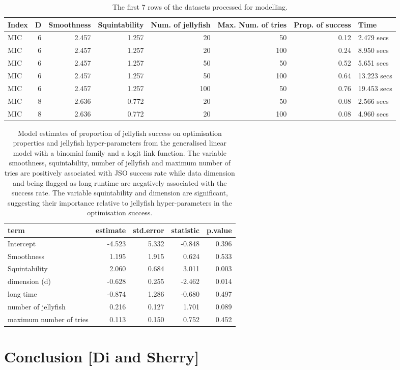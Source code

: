 \documentclass[
  number,
  preprint,
  3p]{elsarticle}
\begin{document}
\begingroup\fontsize{7}{9}\selectfont

\begin{longtable}[t]{lrrrrrrl}

\caption{\label{tbl-mod-data}The first 7 rows of the datasets processed
for modelling.}

\tabularnewline

\toprule
Index & D & Smoothness & Squintability & Num. of jellyfish & Max. Num. of tries & Prop. of success & Time\\
\midrule
MIC & 6 & 2.457 & 1.257 & 20 & 50 & 0.12 & 2.479 secs\\
MIC & 6 & 2.457 & 1.257 & 20 & 100 & 0.24 & 8.950 secs\\
MIC & 6 & 2.457 & 1.257 & 50 & 50 & 0.52 & 5.651 secs\\
MIC & 6 & 2.457 & 1.257 & 50 & 100 & 0.64 & 13.223 secs\\
MIC & 6 & 2.457 & 1.257 & 100 & 50 & 0.76 & 19.453 secs\\
\addlinespace
MIC & 8 & 2.636 & 0.772 & 20 & 50 & 0.08 & 2.566 secs\\
MIC & 8 & 2.636 & 0.772 & 20 & 100 & 0.08 & 4.960 secs\\
\bottomrule

\end{longtable}

\endgroup{}

\begingroup\fontsize{7}{9}\selectfont

\begin{longtable}[t]{|>{}lrrr>{}r|}

\caption{\label{tbl-mod-output}Model estimates of proportion of
jellyfish success on optimisation properties and jellyfish
hyper-parameters from the generalised linear model with a binomial
family and a logit link function. The variable smoothness,
squintability, number of jellyfish and maximum number of tries are
positively associated with JSO success rate while data dimension and
being flagged as long runtime are negatively associated with the success
rate. The variable squintability and dimension are significant,
suggesting their importance relative to jellyfish hyper-parameters in
the optimisation success.}

\tabularnewline

\toprule
term & estimate & std.error & statistic & p.value\\
\midrule
Intercept & -4.523 & 5.332 & -0.848 & 0.396\\
Smoothness & 1.195 & 1.915 & 0.624 & 0.533\\
Squintability & 2.060 & 0.684 & 3.011 & 0.003\\
dimension (d) & -0.628 & 0.255 & -2.462 & 0.014\\
long time & -0.874 & 1.286 & -0.680 & 0.497\\
\addlinespace
number of jellyfish & 0.216 & 0.127 & 1.701 & 0.089\\
maximum number of tries & 0.113 & 0.150 & 0.752 & 0.452\\
\bottomrule

\end{longtable}

\endgroup{}

\section{Conclusion {[}Di and Sherry{]}}\label{sec-conclusion}


\renewcommand\refname{References}
  
\end{document}
